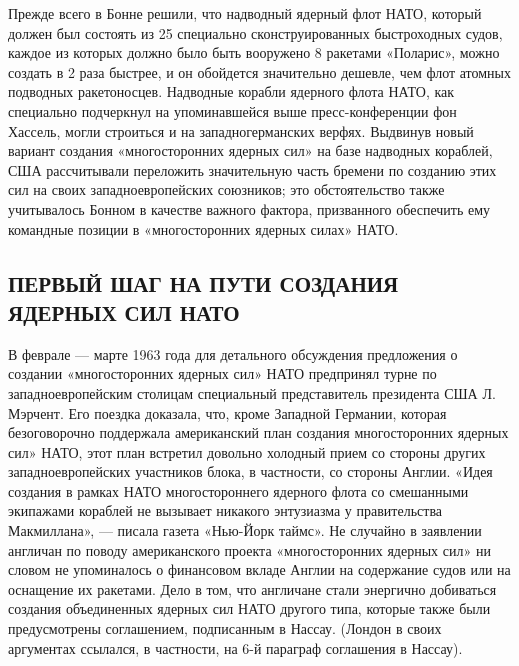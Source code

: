 \documentclass[12pt, a4paper, openany]{book}
\begin{document}
Прежде всего в Бонне решили, что надводный ядерный флот НАТО, который должен был состоять из 25 специально сконструированных быстроходных судов, каждое из которых должно было быть вооружено 8 ракетами «Поларис», можно создать в 2 раза быстрее, и он обойдется значительно  дешевле, чем флот атомных подводных ракетоносцев. Надводные корабли ядерного флота НАТО, как специально подчеркнул на упоминавшейся выше пресс-конференции фон Хассель, могли строиться и на западногерманских верфях. Выдвинув новый вариант создания «многосторонних ядерных сил» на базе надводных кораблей, США рассчитывали переложить значительную часть бремени по созданию этих сил на своих западноевропейских союзников; это обстоятельство также учитывалось Бонном в качестве важного фактора,  призванного обеспечить ему командные позиции в «многосторонних ядерных силах» НАТО.

	\subsection[Первый шаг на пути создания ядерных сил НАТО]{\center ПЕРВЫЙ ШАГ НА ПУТИ СОЗДАНИЯ ЯДЕРНЫХ СИЛ НАТО}


В феврале — марте 1963 года для детального обсуждения предложения о создании «многосторонних ядерных сил» НАТО предпринял турне по западноевропейским столицам специальный представитель президента США Л. Мэрчент. Его поездка доказала, что, кроме Западной Германии, которая безоговорочно поддержала американский план создания многосторонних ядерных сил» НАТО, этот план встретил довольно холодный прием со стороны других  западноевропейских участников блока, в частности, со стороны Англии. «Идея создания в рамках НАТО многостороннего ядерного флота со смешанными экипажами кораблей не вызывает никакого энтузиазма у правительства Макмиллана», — писала газета «Нью-Йорк таймс». Не случайно в заявлении англичан по  поводу американского проекта «многосторонних ядерных сил» ни словом не упоминалось о финансовом вкладе Англии на  содержание судов или на оснащение их ракетами. Дело в том, что англичане стали энергично добиваться создания  объединенных ядерных сил НАТО другого типа, которые также были предусмотрены соглашением, подписанным в Нассау.  (Лондон в своих аргументах ссылался, в частности, на 6-й  параграф соглашения в Нассау).

	

	
	
	\newpage
	\tableofcontents
	
	\thispagestyle{empty} %
	
\end{document}
